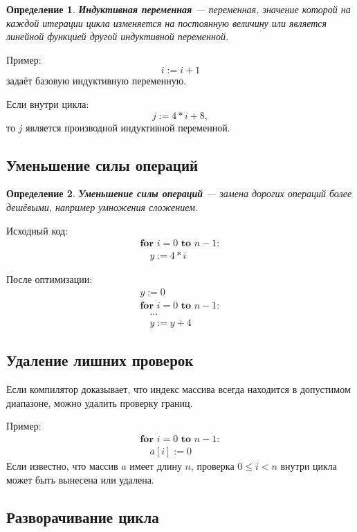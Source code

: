 \documentclass[12pt,a4paper]{article}
\newtheorem{definition}{Определение}
\begin{document}
\begin{definition}
\textbf{Индуктивная переменная} --- переменная, значение которой на каждой итерации цикла изменяется на постоянную величину или является линейной функцией другой индуктивной переменной.
\end{definition}

Пример:
\[
i := i+1
\]
задаёт базовую индуктивную переменную.

Если внутри цикла:
\[
j := 4*i+8,
\]
то $j$ является производной индуктивной переменной.

\subsection{Уменьшение силы операций}

\begin{definition}
\textbf{Уменьшение силы операций} --- замена дорогих операций более дешёвыми, например умножения сложением.
\end{definition}

Исходный код:
\[
\begin{array}{l}
\textbf{for } i=0 \textbf{ to } n-1:\\
\quad y := 4*i
\end{array}
\]

После оптимизации:
\[
\begin{array}{l}
y := 0\\
\textbf{for } i=0 \textbf{ to } n-1:\\
\quad \ldots\\
\quad y := y+4
\end{array}
\]

\subsection{Удаление лишних проверок}

Если компилятор доказывает, что индекс массива всегда находится в допустимом диапазоне, можно удалить проверку границ.

Пример:
\[
\begin{array}{l}
\textbf{for } i=0 \textbf{ to } n-1:\\
\quad a[i] := 0
\end{array}
\]
Если известно, что массив $a$ имеет длину $n$, проверка $0\leq i<n$ внутри цикла может быть вынесена или удалена.

\subsection{Разворачивание цикла}
\end{document}
